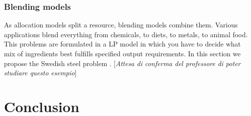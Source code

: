 \documentclass[a4paper,10 pt,titlepage,twoside]{book}
\theoremstyle{plain}
\theoremstyle{definition}
\theoremstyle{remark}
\begin{document}
\subsection*{Blending models}
As allocation models split a resource, blending models combine them. Various applications blend everything from chemicals, to diets, to metals, to animal food. This problems are formulated in a LP model in which you have to decide what mix of ingredients best fulfills specified output requirements. In this section we propose the Swedish steel problem \cite{SP}. [\textit{Attesa di conferma del professore di poter studiare questo esempio}] 
\chapter{Conclusion}

\begin{thebibliography}{9}
	

\end{thebibliography}
\end{document}
